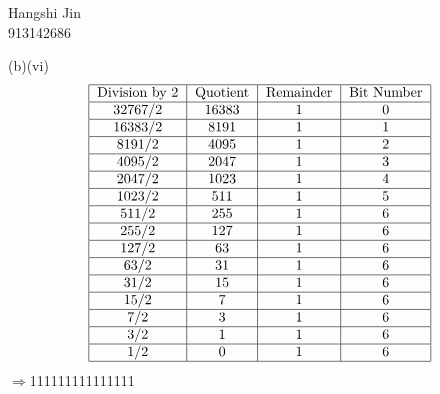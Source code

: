 \documentclass{article}
\begin{document}
\\\\\\\\\\\\\\\\\\\\\begin{flushright}Hangshi Jin\\913142686\end{flushright}(b)(vi)\[\begin{tabular}{|c|c|c|c|}
\hline
\text{Division by 2}&\text{Quotient}&\text{Remainder}&\text{Bit Number}\\
\hline
$32767/2$&16383&1&0\\
\hline
$16383/2$&8191&1&1\\
\hline
$8191/2$&4095&1&2\\
\hline
$4095/2$&2047&1&3\\
\hline
$2047/2$&1023&1&4\\
\hline
$1023/2$&511&1&5\\
\hline
$511/2$&255&1&6\\
\hline
$255/2$&127&1&6\\
\hline
$127/2$&63&1&6\\
\hline
$63/2$&31&1&6\\
\hline
$31/2$&15&1&6\\
\hline
$15/2$&7&1&6\\
\hline
$7/2$&3&1&6\\
\hline
$3/2$&1&1&6\\
\hline
$1/2$&0&1&6\\
\hline
\end{tabular}\]
$\Rightarrow$111111111111111
\end{document}
